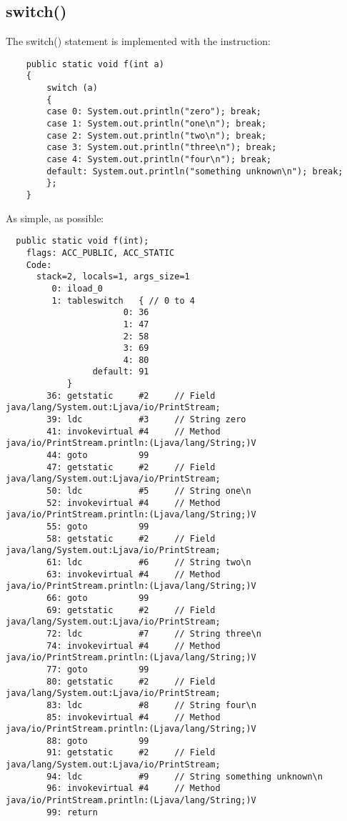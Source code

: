 \subsection{switch()}

The switch() statement is implemented with the  instruction:


\begin{lstlisting}
	public static void f(int a)
	{
		switch (a)
		{
		case 0: System.out.println("zero"); break;
		case 1: System.out.println("one\n"); break;
		case 2: System.out.println("two\n"); break;
		case 3: System.out.println("three\n"); break;
		case 4: System.out.println("four\n"); break;
		default: System.out.println("something unknown\n"); break;
		};
	}
\end{lstlisting}

As simple, as possible:

\begin{lstlisting}
  public static void f(int);
    flags: ACC_PUBLIC, ACC_STATIC
    Code:
      stack=2, locals=1, args_size=1
         0: iload_0       
         1: tableswitch   { // 0 to 4
                       0: 36
                       1: 47
                       2: 58
                       3: 69
                       4: 80
                 default: 91
            }
        36: getstatic     #2     // Field java/lang/System.out:Ljava/io/PrintStream;
        39: ldc           #3     // String zero
        41: invokevirtual #4     // Method java/io/PrintStream.println:(Ljava/lang/String;)V
        44: goto          99
        47: getstatic     #2     // Field java/lang/System.out:Ljava/io/PrintStream;
        50: ldc           #5     // String one\n
        52: invokevirtual #4     // Method java/io/PrintStream.println:(Ljava/lang/String;)V
        55: goto          99
        58: getstatic     #2     // Field java/lang/System.out:Ljava/io/PrintStream;
        61: ldc           #6     // String two\n
        63: invokevirtual #4     // Method java/io/PrintStream.println:(Ljava/lang/String;)V
        66: goto          99
        69: getstatic     #2     // Field java/lang/System.out:Ljava/io/PrintStream;
        72: ldc           #7     // String three\n
        74: invokevirtual #4     // Method java/io/PrintStream.println:(Ljava/lang/String;)V
        77: goto          99
        80: getstatic     #2     // Field java/lang/System.out:Ljava/io/PrintStream;
        83: ldc           #8     // String four\n
        85: invokevirtual #4     // Method java/io/PrintStream.println:(Ljava/lang/String;)V
        88: goto          99
        91: getstatic     #2     // Field java/lang/System.out:Ljava/io/PrintStream;
        94: ldc           #9     // String something unknown\n
        96: invokevirtual #4     // Method java/io/PrintStream.println:(Ljava/lang/String;)V
        99: return        
\end{lstlisting}
